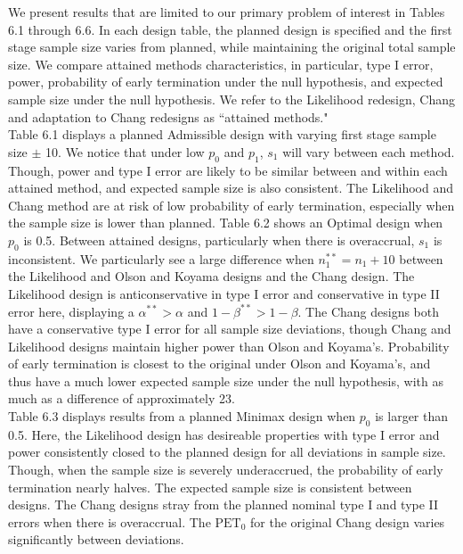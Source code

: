 \documentclass[12pt]{report}\usepackage[]{graphicx}\usepackage[]{color}
\newlength{\li}\setlength{\li}{14.48pt}
\newlength{\di}\setlength{\di}{-3.5mm}
\begin{document}
\indent We present results that are limited to our primary problem of interest in Tables 6.1 through 6.6. In each design table, the planned design is specified and the first stage sample size varies from planned, while maintaining the original total sample size. We compare attained methods characteristics, in particular, type I error, power, probability of early termination under the null hypothesis, and expected sample size under the null hypothesis. We refer to the Likelihood redesign, Chang and adaptation to Chang redesigns as ``attained methods." \\
\indent Table 6.1 displays a planned Admissible design with varying first stage sample size $\pm$ 10. We notice that under low $p_0$ and $p_1$, $s_1$ will vary between each method. Though, power and type I error are likely to be similar between and within each attained method, and expected sample size is also consistent. The Likelihood and Chang method are at risk of low probability of early termination, especially when the sample size is lower than planned. Table 6.2 shows an Optimal design when $p_0$ is 0.5. Between attained designs, particularly when there is overaccrual, $s_1$ is inconsistent. We particularly see a large difference when $n_1^{\ast\ast} = n_1 + 10$ between the Likelihood and Olson and Koyama designs and the Chang design.  The Likelihood design is anticonservative in type I error and conservative in type II error here, displaying a $\alpha^{\ast\ast} > \alpha$ and $1-\beta^{\ast\ast} > 1-\beta$. The Chang designs both have a conservative type I error for all sample size deviations, though Chang and Likelihood designs maintain higher power than Olson and Koyama's. Probability of early termination is closest to the original under Olson and Koyama's, and thus have a much lower expected sample size under the null hypothesis, with as much as a difference of approximately 23.\\
\indent Table 6.3 displays results from a planned Minimax design when $p_0$ is larger than 0.5. Here, the Likelihood design has desireable properties with type I error and power consistently closed to the planned design for all deviations in sample size. Though, when the sample size is severely underaccrued, the probability of early termination nearly halves. The expected sample size is consistent between designs. The Chang designs stray from the planned nominal type I and type II errors when there is overaccrual. The $\mbox{PET}_0$ for the original Chang design varies significantly between deviations. \\
\end{document}
